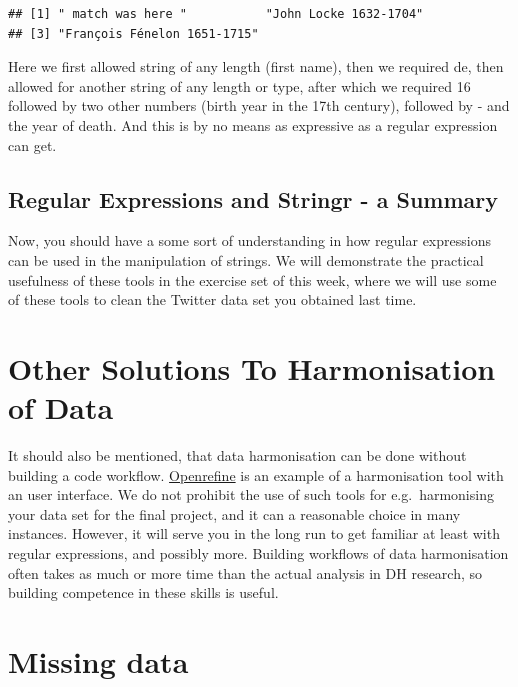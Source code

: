 \documentclass[
]{book}
\begin{document}
\begin{verbatim}
## [1] " match was here "           "John Locke 1632-1704"      
## [3] "François Fénelon 1651-1715"
\end{verbatim}

Here we first allowed string of any length (first name), then we required de, then allowed for another string of any length or type,
after which we required 16 followed by two other numbers (birth year in the 17th century), followed by - and the year of death.
And this is by no means as expressive as a regular expression can get.

\hypertarget{regular-expressions-and-stringr---a-summary}{%
\subsection{Regular Expressions and Stringr - a Summary}\label{regular-expressions-and-stringr---a-summary}}

Now, you should have a some sort of understanding in how regular expressions can be used in the manipulation of strings.
We will demonstrate the practical usefulness of these tools in the exercise set of this week, where we will use some of
these tools to clean the Twitter data set you obtained last time.

\hypertarget{other-solutions-to-harmonisation-of-data}{%
\section{Other Solutions To Harmonisation of Data}\label{other-solutions-to-harmonisation-of-data}}

It should also be mentioned, that data harmonisation can be done without building a code workflow. \href{https://openrefine.org/}{Openrefine} is an example of a harmonisation tool with an user interface. We do not prohibit the use of such tools for e.g.~harmonising your data set for the final project, and it can a reasonable choice in many instances. However, it will serve you in the long run to get familiar at least with regular expressions, and possibly more. Building workflows of data harmonisation often takes as much
or more time than the actual analysis in DH research, so building competence in these skills is useful.

\hypertarget{missing-data}{%
\section{Missing data}\label{missing-data}}
\end{document}
